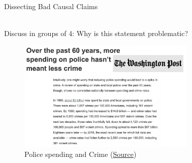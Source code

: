 \documentclass[11pt]{beamer}
\begin{document}
\begin{frame}[fragile]{Dissecting Bad Causal Claims}

   \begin{alertblock} {\centering \vspace{-1.5ex} \\ Discuss in groups of 4: Why is this statement problematic?  \\ \vspace{-1.5ex} } \end{alertblock}

\begin{figure}
    \centering
    \includegraphics[width=0.75\textwidth]{figures/s1_washingtonpost.png}
    \caption{Police spending and Crime (\href{https://www.washingtonpost.com/politics/2020/06/07/over-past-60-years-more-spending-police-hasnt-necessarily-meant-less-crime/
}{Source})}
    \label{fig:wp}
\end{figure}


\end{frame}
\end{document}
